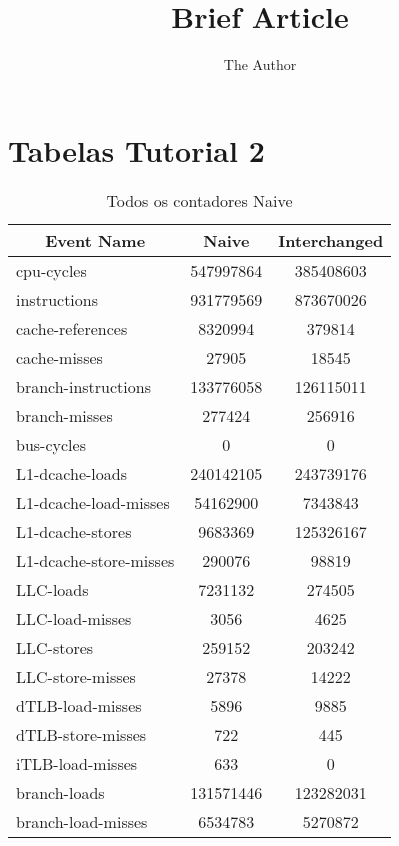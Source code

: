 \documentclass[11pt, oneside]{article}   	%
\title{Brief Article}
\author{The Author}
\begin{document}
\section{Tabelas Tutorial 2}


\begin{table}[h!]
\centering
\label{table:contadores}
\begin{tabular}{|l|c|c|}
\hline
\multicolumn{1}{|c|}{\textbf{Event Name}} & \textbf{Naive} & \textbf{Interchanged} \\ \hline
cpu-cycles                                & 547997864      & 385408603             \\ \hline
instructions                              & 931779569      & 873670026             \\ \hline
cache-references                          & 8320994        & 379814                \\ \hline
cache-misses                              & 27905          & 18545                 \\ \hline
branch-instructions                       & 133776058      & 126115011             \\ \hline
branch-misses                             & 277424         & 256916                \\ \hline
bus-cycles                                & 0              & 0                     \\ \hline
L1-dcache-loads                           & 240142105      & 243739176             \\ \hline
L1-dcache-load-misses                     & 54162900       & 7343843               \\ \hline
L1-dcache-stores                          & 9683369        & 125326167             \\ \hline
L1-dcache-store-misses                    & 290076         & 98819                 \\ \hline
LLC-loads                                 & 7231132        & 274505                \\ \hline
LLC-load-misses                           & 3056           & 4625                  \\ \hline
LLC-stores                                & 259152         & 203242                \\ \hline
LLC-store-misses                          & 27378          & 14222                 \\ \hline
dTLB-load-misses                          & 5896           & 9885                  \\ \hline
dTLB-store-misses                         & 722            & 445                   \\ \hline
iTLB-load-misses                          & 633            & 0                     \\ \hline
branch-loads                              & 131571446      & 123282031             \\ \hline
branch-load-misses                        & 6534783        & 5270872               \\ \hline
\end{tabular}
\caption{Todos os contadores Naive}
\end{table}
\end{document}
